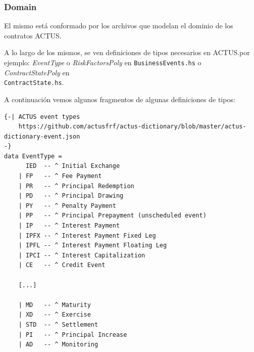 \documentclass[12pt]{book}
\begin{document}
\subsubsection{Domain}

El mismo está conformado por los archivos que modelan el dominio de los contratos ACTUS.\@


A lo largo de los mismos, se ven definiciones de tipos necesarios en ACTUS.\@Como por ejemplo: \textit{EventType} o \textit{RiskFactorsPoly} en \texttt{BusinessEvents.hs} o \textit{ContractStatePoly} en\\ \texttt{ContractState.hs}.

A continuación vemos algunos fragmentos de algunas definiciones de tipos:

\begin{lstlisting}[style=Haskell-cardano, caption=Algunos tipos de eventos.]
{-| ACTUS event types
    https://github.com/actusfrf/actus-dictionary/blob/master/actus-dictionary-event.json
-}
data EventType =
      IED  -- ^ Initial Exchange
    | FP   -- ^ Fee Payment
    | PR   -- ^ Principal Redemption
    | PD   -- ^ Principal Drawing
    | PY   -- ^ Penalty Payment
    | PP   -- ^ Principal Prepayment (unscheduled event)
    | IP   -- ^ Interest Payment
    | IPFX -- ^ Interest Payment Fixed Leg
    | IPFL -- ^ Interest Payment Floating Leg
    | IPCI -- ^ Interest Capitalization
    | CE   -- ^ Credit Event

    [...]

    | MD   -- ^ Maturity
    | XD   -- ^ Exercise
    | STD  -- ^ Settlement
    | PI   -- ^ Principal Increase
    | AD   -- ^ Monitoring
\end{lstlisting}
\end{document}
